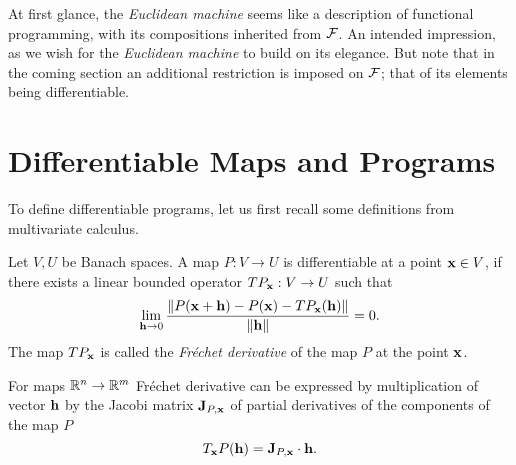 At first glance, the \emph{Euclidean machine} seems like a description of functional programming, with its compositions inherited from $\mathcal{F}$. An intended impression, as we wish for the \emph{Euclidean machine} to build on its elegance. But note that in the coming section an additional restriction is imposed on $\mathcal{F}$; that of its elements being differentiable.

\section{Differentiable Maps and Programs}

To define differentiable programs, let us first recall some
definitions from multivariate calculus.
\begin{definition}[Derivative]
  Let $V,U$ be Banach spaces. A map $P:V\to U$ is differentiable at a point
  $\mathbf{x}\in V$, if there exists a linear bounded operator $TP_{\mathbf{x}}:V\to U$ such that
  \begin{equation}
    \label{eq:frechet}
    \lim_{\mathbf{h}\to 0}\frac{\|P(\mathbf{x}+\mathbf{h})-P(\mathbf{x})-TP_{\mathbf{x}}(\mathbf{h})\|}{\|\mathbf{h}\|} = 0.
  \end{equation}
  The map $TP_{\mathbf{x}}$ is called the \emph{Fréchet derivative} of the map $P$ at the
  point $\mathbf{x}$.
\end{definition}
For maps $\mathbb{R}^n\to \mathbb{R}^m$ Fréchet derivative can be expressed by multiplication
of vector $\mathbf{h}$ by the Jacobi matrix $\mathbf{J}_{P,\mathbf{x}}$ of partial
derivatives of the components of the map $P$
\begin{equation*}
  T_{\mathbf{x}} P(\mathbf{h}) = \mathbf{J}_{P,\mathbf{x}}\cdot \mathbf{h}.
\end{equation*}

